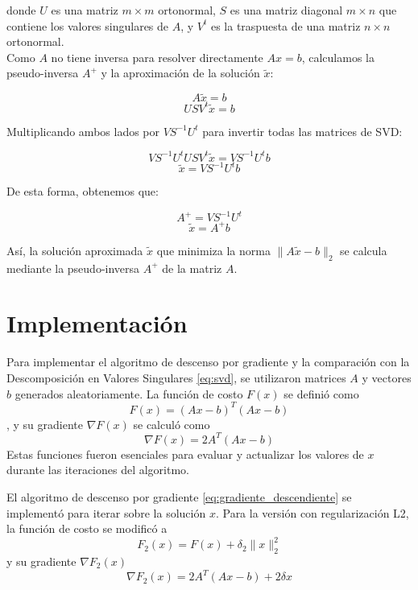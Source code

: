 \documentclass[12pt,a4]{article} %
\begin{document}
donde $U$ es una matriz $m \times m$ ortonormal, $S$ es una matriz diagonal $m \times n$ que contiene los valores singulares de $A$, y $V^t$ es la traspuesta de una matriz $n \times n$ ortonormal.
\\

Como $A$ no tiene inversa para resolver directamente $Ax = b$, calculamos la pseudo-inversa $A^+$ y la aproximación de la solución $\tilde{x}$:

\[
A\tilde{x} = b
\]
\[
US V^t \tilde{x} = b
\]

Multiplicando ambos lados por $VS^{-1}U^t$ para invertir todas las matrices de SVD:

\[
VS^{-1}U^tUSV^t\tilde{x} = VS^{-1}U^tb
\]
\[
\tilde{x} = VS^{-1}U^tb
\]

De esta forma, obtenemos que:

\[
A^+ = VS^{-1}U^t
\]
\[
\tilde{x} = A^+b
\]

Así, la solución aproximada $\tilde{x}$ que minimiza la norma $\|A\tilde{x} - b\|_2$ se calcula mediante la pseudo-inversa $A^+$ de la matriz $A$.
\\

\section{Implementación}
Para implementar el algoritmo de descenso por gradiente y la comparación con la Descomposición en Valores Singulares \ref{eq:svd}, se utilizaron matrices \(A\) y vectores \(b\) generados aleatoriamente. La función de costo \(F(x)\) se definió como 
\begin{equation}
    F(x) = (Ax - b)^T (Ax - b)
    \label{F1}
\end{equation}
, y su gradiente \(\nabla F(x)\) se calculó como 
\begin{equation}
    \nabla F(x) = 2A^T (Ax - b)
    \label{gradF1}
\end{equation}
 Estas funciones fueron esenciales para evaluar y actualizar los valores de \(x\) durante las iteraciones del algoritmo.

El algoritmo de descenso por gradiente \ref{eq:gradiente_descendiente} se implementó para iterar sobre la solución \(x\). Para la versión con regularización L2, la función de costo se modificó a 
\begin{equation}
    F_2(x) = F(x) + \delta_2 \|x\|_2^2
    \label{eq:regularizacion}
\end{equation}
 y su gradiente \(\nabla F_2(x)\)
 \begin{equation}
     \nabla F_2(x) = 2 A^T (Ax-b)+2\delta x
 \end{equation}
\end{document}

